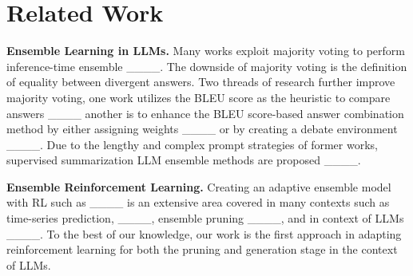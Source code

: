\section{Related Work}
\vspace{-4pt}
\textbf{Ensemble Learning in LLMs.} Many works exploit majority voting to perform inference-time ensemble  ____. The downside of majority voting is the definition of equality between divergent answers. %
Two threads of research further improve majority voting, one work utilizes the BLEU score as the heuristic to compare answers ____ another is to enhance the BLEU score-based answer combination method by either assigning weights ____ or by creating a debate environment ____. Due to the lengthy and complex prompt strategies of former works, supervised summarization LLM ensemble methods are proposed ____.

\textbf{Ensemble Reinforcement Learning.} Creating an adaptive ensemble model with RL such as ____ is an extensive area covered in many contexts such as time-series prediction, ____, ensemble pruning ____, and in context of LLMs ____. To the best of our knowledge, our work is the first approach in adapting reinforcement learning for both the pruning and generation stage in the context of LLMs.